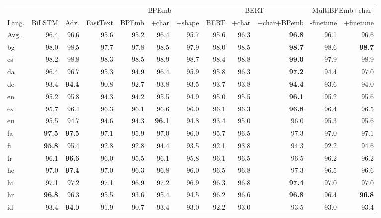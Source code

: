 \documentclass[11pt,a4paper]{article}
\begin{document}
\label{sec:pos-tagging}
\begin{table*}
	\centering
	\small
	\begin{adjustbox}{max width=\linewidth}
		\begin{tabular}{lrrr|rrr|rrr|rr}
\toprule

 & & & & \multicolumn{3}{|c|}{BPEmb} & \multicolumn{3}{|c}{BERT} & \multicolumn{2}{|c}{MultiBPEmb+char}\\
Lang. & BiLSTM & Adv. & FastText & BPEmb & +char & +shape & BERT & +char & +char+BPemb & -finetune & +finetune \\

\midrule
Avg. & 96.4 & 96.6 & 95.6 & 95.2 & 96.4 & 95.7 & 95.6 & 96.3 & \textbf{96.8} & 96.1 & 96.6\\
\midrule
bg & 98.0 & 98.5 & 97.7 & 97.8 & 98.5 & 97.9 & 98.0 & 98.5 & \textbf{98.7} & 98.6 & \textbf{98.7}\\
cs & 98.2 & 98.8 & 98.3 & 98.5 & 98.9 & 98.7 & 98.4 & 98.8 & \textbf{99.0} & 97.9 & 98.9\\
da & 96.4 & 96.7 & 95.3 & 94.9 & 96.4 & 95.9 & 95.8 & 96.3 & \textbf{97.2} & 94.4 & 97.0\\
de & 93.4 & \textbf{94.4} & 90.8 & 92.7 & 93.8 & 93.5 & 93.7 & 93.8 & \textbf{94.4} & 93.6 & 94.0\\
en & 95.2 & 95.8 & 94.3 & 94.2 & 95.5 & 94.9 & 95.0 & 95.5 & \textbf{96.1} & 95.2 & 95.6\\
es & 95.7 & 96.4 & 96.3 & 96.1 & 96.6 & 96.0 & 96.1 & 96.3 & \textbf{96.8} & 96.4 & 96.5\\
eu & 95.5 & 94.7 & 94.6 & 94.3 & \textbf{96.1} & 94.8 & 93.4 & 95.0 & 96.0 & 95.3 & 95.6\\
fa & \textbf{97.5} & \textbf{97.5} & 97.1 & 95.9 & 97.0 & 96.0 & 95.7 & 96.5 & 97.3 & 97.0 & 97.1\\
fi & \textbf{95.8} & 95.4 & 92.8 & 92.8 & 94.4 & 93.5 & 92.1 & 93.8 & 94.3 & 92.2 & 94.6\\
fr & 96.1 & \textbf{96.6} & 96.0 & 95.5 & 96.1 & 95.8 & 96.1 & 96.5 & 96.5 & 96.2 & 96.2\\
he & 97.0 & \textbf{97.4} & 97.0 & 96.3 & 96.8 & 96.0 & 96.5 & 96.8 & 97.3 & 96.5 & 96.6\\
hi & 97.1 & 97.2 & 97.1 & 96.9 & 97.2 & 96.9 & 96.3 & 96.8 & \textbf{97.4} & 97.0 & 97.0\\
hr & \textbf{96.8} & 96.3 & 95.5 & 93.6 & 95.4 & 94.5 & 96.2 & 96.6 & \textbf{96.8} & 96.4 & \textbf{96.8}\\
id & 93.4 & \textbf{94.0} & 91.9 & 90.7 & 93.4 & 93.0 & 92.2 & 93.0 & 93.5 & 93.0 & 93.4\\

\end{tabular}
\end{adjustbox}
\end{table*}
\end{document}
